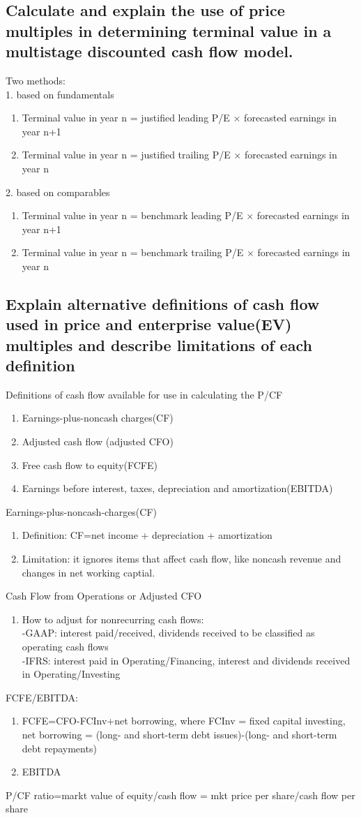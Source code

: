 \documentclass{article}
\newcommand{\be}{\begin{enumerate}}
\newcommand{\ee}{\end{enumerate}}
\begin{document}
\subsection{Calculate and explain the use of price multiples in determining terminal
value in a multistage discounted cash flow model.}
Two methods:
\\1. based on fundamentals
\be
    \item Terminal value in year n = justified leading P/E $\times$ forecasted earnings
        in year n+1
    \item Terminal value in year n = justified trailing P/E $\times$ forecasted earnings
        in year n
\ee
2. based on comparables
\be
    \item Terminal value in year n = benchmark leading P/E $\times$ forecasted earnings
        in year n+1
    \item Terminal value in year n = benchmark trailing P/E $\times$ forecasted earnings
        in year n
\ee
\subsection{Explain alternative definitions of cash flow used in price and enterprise value(EV)
multiples and describe limitations of each definition}
Definitions of cash flow available for use in calculating the P/CF
\be
    \item Earnings-plus-noncash charges(CF)
    \item Adjusted cash flow (adjusted CFO)
    \item Free cash flow to equity(FCFE)
    \item Earnings before interest, taxes, depreciation and amortization(EBITDA)
\ee
Earnings-plus-noncash-charges(CF)
\be
    \item Definition: CF=net income + depreciation + amortization
    \item Limitation: it ignores items that affect cash flow, like noncash revenue 
        and changes in net working captial.
\ee
Cash Flow from Operations or Adjusted CFO
\be
    \item How to adjust for nonrecurring cash flows: 
        \\-GAAP: interest paid/received, dividends received to be classified
        as operating cash flows
        \\-IFRS: interest paid in Operating/Financing, interest and dividends
        received in Operating/Investing
\ee
FCFE/EBITDA:
\be
    \item FCFE=CFO-FCInv+net borrowing, where FCInv = fixed capital investing,
        net borrowing = (long- and short-term debt issues)-(long- and short-term
        debt repayments)
    \item EBITDA
\ee
P/CF ratio=markt value of equity/cash flow = mkt price per share/cash flow per share
\end{document}
